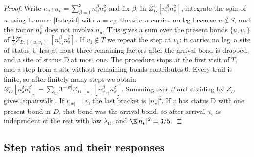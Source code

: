 \begin{proof}
Write $n_u \cdot n_v = \sum_{\beta = 1}^3 n_u^\beta n_v^\beta$ and fix $\beta$. In $Z^\cdot_D[n_u^\beta n_v^\beta]$, integrate the spin of $u$ using Lemma~\ref{l:stepid} with $a = e_\beta$; the site $u$ carries no leg because $u \notin S$, and the factor $n_v^\beta$ does not involve $n_u$. This gives a sum over the present bonds $\{u, v_1\}$ of $\frac13 Z^\cdot_{D;[(u, v_1)]}[n_{v_1}^\beta n_v^\beta]$. If $v_1 \notin T$ we repeat the step at $v_1$: it carries no leg, a site of status $\mathrm U$ has at most three remaining factors after the arrival bond is dropped, and a site of status $\mathrm D$ at most one. The procedure stops at the first visit of $T$, and a step from a site without remaining bonds contributes $0$. Every trail is finite, so after finitely many steps we obtain $Z^\cdot_D[n_u^\beta n_v^\beta] = \sum_w 3^{-|w|} Z^\cdot_{D;[w]}[n_{v_{|w|}}^\beta n_v^\beta]$. Summing over $\beta$ and dividing by $Z^\cdot_D$ gives \eqref{e:pairwalk}. If $v_{|w|}=v$, the last bracket is $|n_v|^2$. If $v$ has
status $\mathrm D$ with one present bond in $D$, that bond was the
arrival bond, so after arrival $n_v$ is independent of the rest with
law $\lambda_{\mathrm D}$, and $\E|n_v|^2=3/5$.
\end{proof}

\subsection{Step ratios and their responses}\label{s:steps}

